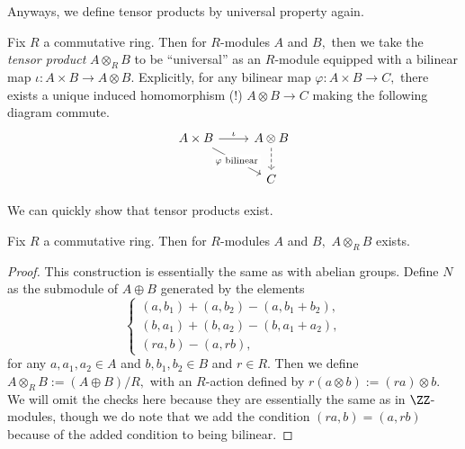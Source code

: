 Anyways, we define tensor products by universal property again.
\begin{definition}
	Fix $R$ a commutative ring. Then for $R$-modules $A$ and $B,$ then we take the \textit{tensor product} $A\otimes_RB$ to be ``universal'' as an $R$-module equipped with a bilinear map $\iota:A\times B\to A\otimes B.$ Explicitly, for any bilinear map $\varphi:A\times B\to C,$ there exists a unique induced homomorphism (!) $A\otimes B\to C$ making the following diagram commute.
	\[\begin{tikzcd}
		{A\times B} & {A\otimes B} \\
		& C
		\arrow["{\varphi\text{ bilinear}}"{description}, from=1-1, to=2-2]
		\arrow[dashed, from=1-2, to=2-2]
		\arrow["\iota", from=1-1, to=1-2]
	\end{tikzcd}\]
\end{definition}
We can quickly show that tensor products exist.
\begin{prop}
	Fix $R$ a commutative ring. Then for $R$-modules $A$ and $B,$ $A\otimes_RB$ exists.
\end{prop}
\begin{proof}
	This construction is essentially the same as with abelian groups. Define $N$ as the submodule of $A\oplus B$ generated by the elements
	\[\begin{cases}
		(a,b_1)+(a,b_2)-(a,b_1+b_2), \\
		(b,a_1)+(b,a_2)-(b,a_1+a_2), \\
		(ra,b) - (a,rb),
	\end{cases}\]
	for any $a,a_1,a_2\in A$ and $b,b_1,b_2\in B$ and $r\in R.$ Then we define $A\otimes_RB:=(A\oplus B)/R,$ with an $R$-action defined by $r(a\otimes b):=(ra)\otimes b.$ We will omit the checks here because they are essentially the same as in $\ZZ$-modules, though we do note that we add the condition $(ra,b)=(a,rb)$ because of the added condition to being bilinear.
\end{proof}

